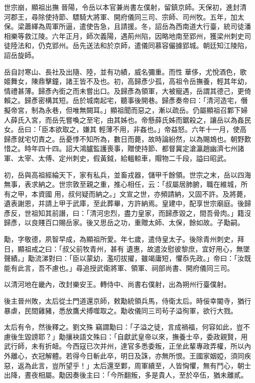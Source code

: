 \begin{pinyinscope}
 世宗崩，顯祖出撫
 晉陽，令岳以本官兼尚書左僕射，留鎮京師。天保初，進封清河郡王，尋除使持節、驃騎大將軍、開府儀同三司、宗師、司州牧。五年，加太保。梁蕭繹為周軍所逼，遣使告急，且請援。冬，詔岳為西南道大行臺，統司徒潘相樂等救江陵。六年正月，師次義陽，遇荊州陷，因略地南至郢州，獲梁州刺史司徒陸法和，仍克郢州。岳先送法和於京師，遣儀同慕容儼據郢城。朝廷知江陵陷，詔岳旋師。



 岳自討寒山、長社及出隨、陸，並有功績，威名彌重。而性
 華侈，尤悅酒色，歌姬舞女，陳鼎擊鐘，諸王皆不及也。初，高歸彥少孤，高祖令岳撫養，輕其年幼，情禮甚薄。歸彥內銜之而未嘗出口。及歸彥為領軍，大被寵遇，岳謂其德己，更倚賴之。歸彥密構其短。岳於城南起宅，聽事後開巷。歸彥奏帝曰：「清河造宅，僭擬帝宮，制為永巷，但唯無闕耳。」顯祖聞而惡之，漸以疏岳。仍屬顯祖召鄴下婦人薛氏入宮，而岳先嘗喚之至宅，由其姊也。帝懸薛氏姊而鋸殺之，讓岳以為姦民女。岳曰：「臣本欲取之，嫌其
 輕薄不用，非姦也。」帝益怒。六年十一月，使高歸彥就宅切責之。岳憂悸不知所為，數日而薨，故時論紛然，以為賜鴆也。朝野歎惜之。時年四十四。詔大鴻臚監護喪事，贈使持節、都督冀定滄瀛趙幽濟七州諸軍、太宰、太傅、定州刺史，假黃鉞，給轀輬車，賵物二千段，謚曰昭武。



 初，岳與高祖經綸天下，家有私兵，並畜戎器，儲甲千餘領。世宗之末，岳以四海無事，表求納之。世宗敦至親之重，推心相任，云：「叔屬居肺腑，職在維城，所有之甲，本資國
 用，叔何疑而納之。」文宣之世，亦頻請納，又固不許。及將薨，遺表謝恩，并請上甲于武庫，至此葬畢，方許納焉。皇建中，配享世宗廟庭。後歸彥反，世祖知其前譖，曰：「清河忠烈，盡力皇家，而歸彥毀之，間吾骨肉。」籍沒歸彥，以良賤百口賜岳家。後又思岳之功，重贈太師、太保，餘如故。子勱嗣。



 勱，字敬德，夙智早成，為顯祖所愛。年七歲，遣侍皇太子。後除青州刺史，拜日，顯祖戒之曰：「叔父前牧青州，甚有
 遺惠，故遣汝慰彼黎庶，宜好用心，無墜聲績。」勱流涕對曰：「臣以蒙幼，濫叨拔擢，雖竭庸短，懼忝先政。」帝曰：「汝既能有此言，吾不慮也。」尋追授武衛將軍、領軍、祠部尚書、開府儀同三司。



 以清河地在畿內，改封樂安王。轉侍中、尚書右僕射，出為朔州行臺僕射。



 後主晉州敗，太后從土門道還京師，敕勱統領兵馬，侍衛太后。時佞幸閽寺，猶行暴虐，民間雞豬，悉放鷹犬搏噬取之。勱收儀同三司茍子溢徇軍，欲行大戮。



 太后有令，然後釋之。劉文殊
 竊謂勱曰：「子溢之徒，言成禍福，何容如此，豈不慮後生毀謗耶？」勱攘袂語文殊曰：「自獻武皇帝以來，撫養士卒，委政親賢，用武行師，未有折衄。今西寇已次并州，達官多悉委叛，正坐此輩專政弄權，所以內外離心，衣冠解體。若得今日斬此卒，明日及誅，亦無所恨。王國家姻婭，須同疾惡，返為此言，豈所望乎！」太后還至鄴，周軍續至，人皆恟懼，無有鬥心，朝士出降，晝夜相屬。勱因奏後主曰：「今所翻叛，多是貴人，至於卒伍，猶未離貳。




\end{pinyinscope}
